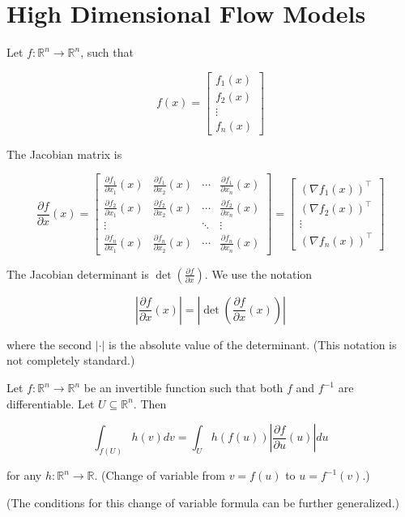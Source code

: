 \section{High Dimensional Flow Models}

\begin{concept}
    Let $f: \mathbb{R}^{n} \rightarrow \mathbb{R}^{n}$, such that

    $$
    f(x)=\left[\begin{array}{c}
    f_{1}(x) \\
    f_{2}(x) \\
    \vdots \\
    f_{n}(x)
    \end{array}\right]
    $$

    The Jacobian matrix is

    $$
    \frac{\partial f}{\partial x}(x)=\left[\begin{array}{cccc}
    \frac{\partial f_{1}}{\partial x_{1}}(x) & \frac{\partial f_{1}}{\partial x_{2}}(x) & \cdots & \frac{\partial f_{1}}{\partial x_{n}}(x) \\
    \frac{\partial f_{2}}{\partial x_{1}}(x) & \frac{\partial f_{2}}{\partial x_{2}}(x) & \cdots & \frac{\partial f_{2}}{\partial x_{n}}(x) \\
    \vdots & & \ddots & \vdots \\
    \frac{\partial f_{n}}{\partial x_{1}}(x) & \frac{\partial f_{n}}{\partial x_{2}}(x) & \cdots & \frac{\partial f_{n}}{\partial x_{n}}(x)
    \end{array}\right]=\left[\begin{array}{c}
    \left(\nabla f_{1}(x)\right)^{\top} \\
    \left(\nabla f_{2}(x)\right)^{\top} \\
    \vdots \\
    \left(\nabla f_{n}(x)\right)^{\top}
    \end{array}\right]
    $$

    The Jacobian determinant is $\operatorname{det}\left(\frac{\partial f}{\partial x}\right)$. We use the notation

    $$
    \left|\frac{\partial f}{\partial x}(x)\right|=\left|\operatorname{det}\left(\frac{\partial f}{\partial x}(x)\right)\right|
    $$

    where the second $|\cdot|$ is the absolute value of the determinant. (This notation is not completely standard.)
\end{concept}

\begin{concept}
    Let $f: \mathbb{R}^{n} \rightarrow \mathbb{R}^{n}$ be an invertible function such that both $f$ and $f^{-1}$ are differentiable. Let $U \subseteq \mathbb{R}^{n}$. Then

    $$
    \int_{f(U)} h(v) d v=\int_{U} h(f(u))\left|\frac{\partial f}{\partial u}(u)\right| d u
    $$

    for any $h: \mathbb{R}^{n} \rightarrow \mathbb{R}$. (Change of variable from $v=f(u)$ to $u=f^{-1}(v)$.)

    (The conditions for this change of variable formula can be further generalized.)
\end{concept}

